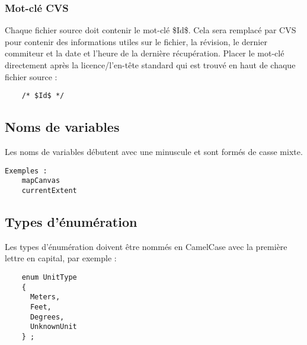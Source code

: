 \subsubsection{Mot-clé CVS}
Chaque fichier source doit contenir le mot-clé \$Id\$. Cela sera remplacé par CVS pour contenir des informations utiles sur le fichier, la révision, le dernier commiteur et la date et l'heure de la dernière récupération. 
Placer le mot-clé directement après la licence/l'en-tête standard qui est trouvé en haut de chaque fichier source :
\begin{verbatim}
	/* $Id$ */
\end{verbatim}

\subsection{Noms de variables}
Les noms de variables débutent avec une minuscule et sont formés de casse mixte.
\begin{verbatim}
Exemples :
	mapCanvas
	currentExtent
\end{verbatim}
\subsection{Types d'énumération}
Les types d'énumération doivent être nommés en CamelCase avec la première lettre en capital, par exemple :
\begin{verbatim}
    enum UnitType
    {
      Meters,
      Feet,
      Degrees,
      UnknownUnit
    } ;
\end{verbatim}

